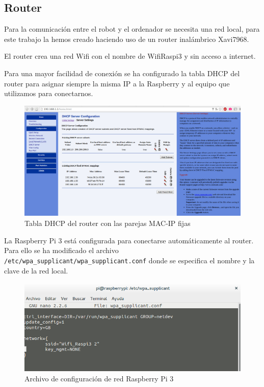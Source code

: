\documentclass[twoside, 12pt]{epstfg}
\begin{document}
\subsection{Router}
Para la comunicación entre el robot y el ordenador se necesita una red local,  para este trabajo la hemos creado haciendo uso de un router inalámbrico Xavi7968.

El router crea una red Wifi con el nombre de WifiRaspi3 y sin acceso a internet.

Para una mayor facilidad de conexión se ha configurado la tabla DHCP del router para asignar siempre la misma IP a la Raspberry y al equipo que utilizamos para conectarnos.

\begin{figure}[h]
	\centerline{
		\mbox{\includegraphics[width=.95\textwidth]{images/TablaDHCP2.png}}
	}
	\caption{Tabla DHCP del router con las parejas MAC-IP fijas}
\end{figure}

La Raspberry Pi 3 está configurada para conectarse automáticamente al router. Para ello se ha modificado el archivo \texttt{/etc/wpa\_supplicant/wpa\_supplicant.conf} donde se especifica el nombre y la clave de la red local.

\begin{figure}[h]
	\centerline{
		\mbox{\includegraphics[width=.95\textwidth]{images/confRaspiWifi.png}}
	}
	\caption{Archivo de configuración de red Raspberry Pi 3}
\end{figure}
 
\end{document}
